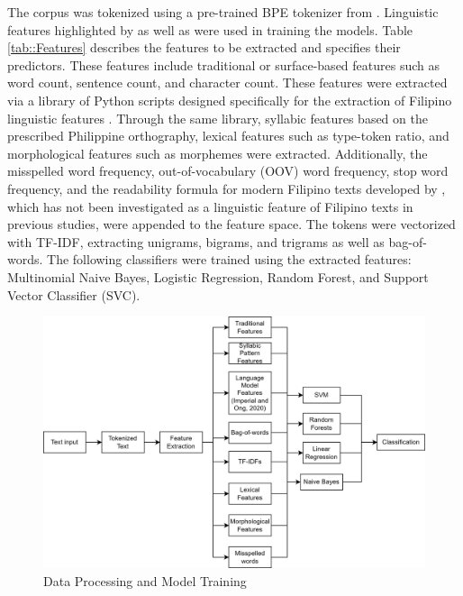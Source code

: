 The corpus was tokenized using a pre-trained BPE tokenizer from . Linguistic features highlighted by  as well as  were used in training the models. Table \ref{tab::Features} describes the features to be extracted and specifies their predictors. These features include traditional or surface-based features such as word count, sentence count, and character count. These features were extracted via a library of Python scripts designed specifically for the extraction of Filipino linguistic features \cite{imperial-2020, imperial-2021}. Through the same library, syllabic features based on the prescribed Philippine orthography, lexical features such as type-token ratio, and morphological features such as morphemes were extracted. Additionally, the misspelled word frequency, out-of-vocabulary (OOV) word frequency, stop word frequency, and the readability formula for modern Filipino texts developed by , which has not been investigated as a linguistic feature of Filipino texts in previous studies, were appended to the feature space. The tokens were vectorized with TF-IDF, extracting unigrams, bigrams, and trigrams as well as bag-of-words. The following classifiers were trained using the extracted features: Multinomial Naive Bayes, Logistic Regression, Random Forest, and Support Vector Classifier (SVC).

\begin{figure}[h]
\includegraphics[width=\textwidth,height=\textheight,keepaspectratio]{figures/Model Training.png}
  \caption{Data Processing and Model Training}
  \label{fig:Model}
\end{figure}

